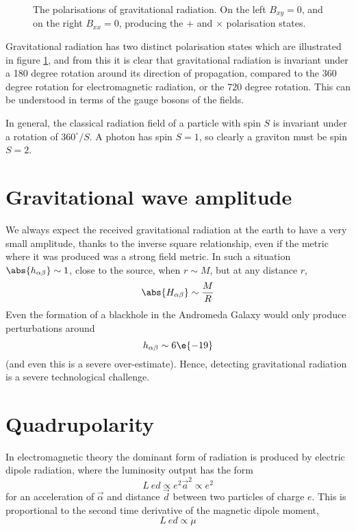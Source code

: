 \begin{figure}[h]
  \centering
  
  \caption{The polarisations of gravitational radiation. On the left
    $B_{xy} = 0$, and on the right $B_{xx} = 0$, producing the $+$ and
    $\times$ polarisation states.}
  \label{fig:polarisation}
\end{figure}

Gravitational radiation has two distinct polarisation states which are
illustrated in figure \ref{fig:polarisation}, and from this it is
clear that gravitational radiation is invariant under a 180 degree
rotation around its direction of propagation, compared to the 360
degree rotation for electromagnetic radiation, or the 720 degree
rotation. This can be understood in terms of the gauge bosons of the
fields.

In general, the classical radiation field of a particle with spin $S$
is invariant under a rotation of $360^{\circ}/S$. A photon has spin
$S=1$, so clearly a graviton must be spin $S=2$.

\section{Gravitational wave amplitude}
\label{sec:grav-wave-ampl}

We always expect the received gravitational radiation at the earth to
have a very small amplitude, thanks to the inverse square
relationship, even if the metric where it was produced was a strong
field metric. In such a situation $\abs{h_{\alpha \beta}}\sim 1$,
close to the source, when $r \sim M$, but at any distance $r$,
\begin{equation}
  \label{eq:32}
  \abs{H_{\alpha \beta}} \sim \frac{M}{R}
\end{equation}
Even the formation of a blackhole in the Andromeda Galaxy would only produce perturbations around 
\[ h_{\alpha \beta} \sim 6\e{-19} \] (and even this is a severe
over-estimate). Hence, detecting gravitational radiation is a severe
technological challenge.


\section{Quadrupolarity}
\label{sec:quadrupolarity}

In electromagnetic theory the dominant form of radiation is produced
by electric dipole radiation, where the luminosity output has the form
\begin{equation}
  \label{eq:33}
  L~{ed} \propto e^2 \vec{a}^2 \propto e^2
\end{equation}
for an acceleration of $\vec{\alpha}$ and distance $\vec{d}$ between
two particles of charge $e$. This is proportional to the second time
derivative of the magnetic dipole moment, 
\[ L~{ed} \propto \ddot{\mu} \]

